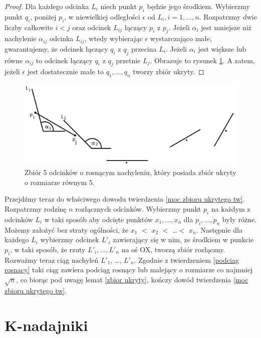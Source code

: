 \documentclass[brudnopis]{xmgr}
\theoremstyle{definition}
\begin{document}
\begin{proof}
	Dla każdego odcinka $L_i$ niech punkt $p_i$ będzie jego środkiem. Wybierzmy punkt $q_i$, poniżej $p_i$, w niewielkiej odległości $\epsilon$ od $L_i, i = 1,\ldots,n$. Rozpatrzmy dwie liczby całkowite $i < j$ oraz odcinek $L_{ij}$ łączący $p_i$ z $p_j$. Jeżeli $\alpha_i$ jest mniejsze niż nachylenie $\alpha_{ij}$ odcinka $L_{ij}$, wtedy wybierając $\epsilon$ wystarczająco małe, gwarantujemy, że odcinek łączący $q_i$ z $q_j$ przecina $L_i$. Jeżeli $\alpha_i$ jest większe lub równe $\alpha_{ij}$ to odcinek łączący $q_i$ z $q_j$ przetnie $L_j$. Obrazuje to rysunek \ref{fig:5 zbior ukryty}. A zatem, jeżeli $\epsilon$ jest dostatecznie małe to  $q_1, \ldots, q_n$ tworzy zbiór ukryty. 
\end{proof}
\begin{figure}[ht!]
  \centering
   \includegraphics{rysunki/5_odcinkow_zbior_ukryty.png}
   \caption{Zbiór 5 odcinków o rosnącym nachyleniu, który posiada zbiór ukryty o rozmiarze równym 5.}
   \label{fig:5 zbior ukryty}
\end{figure}
\indent Przejdźmy teraz do właściwego dowodu twierdzenia \ref{moc zbioru ukrytego tw}. Rozpatrzmy rodzinę $n$ rozłącznych odcinków. Wybierzmy punkt $p_i$ na każdym z odcinków $L_i$ w taki sposób aby odcięte punktów $x_1,\ldots, x_n$ dla $p_i,\ldots,p_n$ były różne. Możemy założyć bez straty ogólności, że $x_1$ $<$ $x_2$ $<$ \ldots $<$ $x_n$. Następnie dla każdego $L_i$ wybierzmy odcinek $L'_i$ zawierający się w nim, ze środkiem w punkcie $p_i$, w taki sposób, że rzuty $L'_i,\ldots,L'_n$ na oś OX, tworzą zbiór rozłączny. Rozważmy teraz ciąg nachyleń $L'_1$, \ldots, $L'_n$. Zgodnie z twierdzeniem \ref{podciag rosnacy} taki ciąg zawiera podciąg rosnący lub malejący o rozmiarze co najmniej $\sqrt{n}$, co biorąc pod uwagę lemat \ref{zbior ukryty}, kończy dowód twierdzenia \ref{moc zbioru ukrytego tw}.

\chapter{K-nadajniki}
\end{document}
